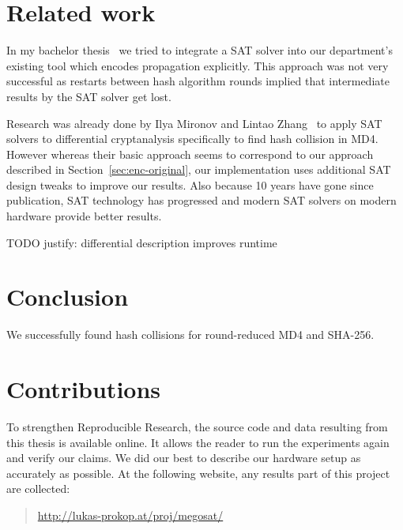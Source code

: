 \section{Related work}
\label{sec:results-related}
%
In my bachelor thesis~\cite{bach} we tried to integrate a SAT solver into
our department's existing tool which encodes propagation explicitly. This approach
was not very successful as restarts between hash algorithm rounds implied that
intermediate results by the SAT solver get lost.

Research was already done by Ilya Mironov and Lintao Zhang~\cite{mironov2006applications}
to apply SAT solvers to differential cryptanalysis specifically to find hash collision
in MD4. However whereas their basic approach seems to correspond to our approach described
in Section~\ref{sec:enc-original}, our implementation uses additional SAT design tweaks
to improve our results. Also because 10 years have gone since publication, SAT technology
has progressed and modern SAT solvers on modern hardware provide better results.



TODO justify: differential description improves runtime


\section{Conclusion}
\label{sec:conclusion}

We successfully found hash collisions for round-reduced MD4 and SHA-256.

\section{Contributions}
\label{sec:contributions}
%
To strengthen Reproducible Research, the source code and data resulting from this thesis is available online.
It allows the reader to run the experiments again and verify our claims.
We did our best to describe our hardware setup as accurately as possible.
At the following website, any results part of this project are collected:

\begin{quote}
  \url{http://lukas-prokop.at/proj/megosat/}
\end{quote}

